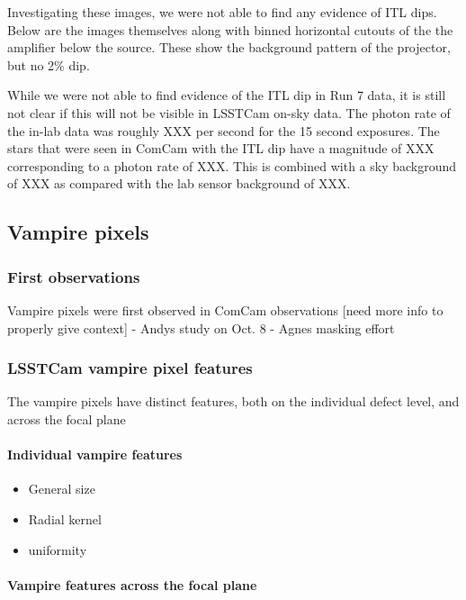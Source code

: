 Investigating these images, we were not able to find any evidence of ITL
dips. Below are the images themselves along with binned horizontal
cutouts of the the amplifier below the source. These show the background
pattern of the projector, but no 2\% dip.

While we were not able to find evidence of the ITL dip in Run 7 data, it
is still not clear if this will not be visible in LSSTCam on-sky data.
The photon rate of the in-lab data was roughly XXX per second for the 15
second exposures. The stars that were seen in ComCam with the ITL dip
have a magnitude of XXX corresponding to a photon rate of XXX. This is
combined with a sky background of XXX as compared with the lab sensor
background of XXX.

\subsection{Vampire pixels}\label{vampire-pixels}

\subsubsection{First observations}\label{first-observations}

Vampire pixels were first observed in ComCam observations {[}need more
info to properly give context{]} - Andy\textquotesingle s study on Oct.
8 - Agnes masking effort

\subsubsection{LSSTCam vampire pixel
features}\label{lsstcam-vampire-pixel-features}

The vampire pixels have distinct features, both on the individual defect
level, and across the focal plane

\paragraph{Individual vampire
features}\label{individual-vampire-features}

\begin{itemize}
\tightlist
\item
  General size
\item
  Radial kernel
\item
  uniformity
\end{itemize}

\paragraph{Vampire features across the focal
plane}\label{vampire-features-across-the-focal-plane}


